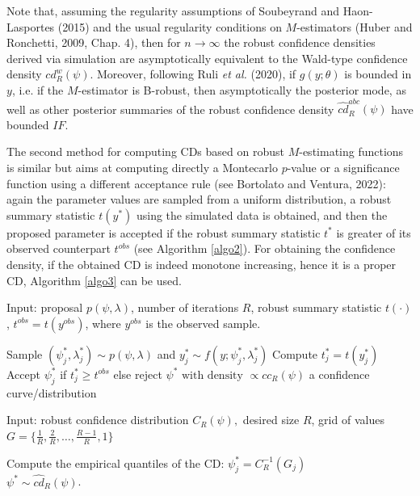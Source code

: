 \documentclass[preprint,12pt,authoryear]{elsarticle}
\begin{document}
Note that, assuming the regularity assumptions of Soubeyrand and Haon-Lasportes (2015) and the usual regularity conditions on $M$-estimators (Huber and Ronchetti, 2009, Chap. 4), then for $n \to \infty$ the robust confidence densities derived via simulation are asymptotically equivalent to the Wald-type confidence density $cd_R^w(\psi)$. Moreover, following Ruli {\em et al.} (2020), if $g(y;\theta)$ is bounded in $y$, i.e. if the $M$-estimator is B-robust, then asymptotically the posterior mode, as well as other posterior summaries of the robust confidence density $\hat{cd}_R^{abc} (\psi)$ have bounded $IF$. 

The second method  for computing  CDs based on robust $M$-estimating functions  is similar but aims at computing directly a Montecarlo $p$-value  or a significance function using a different acceptance rule (see Bortolato and Ventura, 2022): again the parameter values are sampled from a uniform distribution, a robust summary statistic $t(y^*)$  using the simulated data is obtained, and then the proposed parameter is accepted if the robust summary statistic $t^*$ is greater of its observed counterpart $t^{obs}$ (see Algorithm \ref{algo2}).
For obtaining the confidence density, if the obtained CD is indeed monotone increasing, hence it is a proper CD, Algorithm \ref{algo3} can be used.


\begin{algorithm}[H]
 \caption{Accept-reject confidence curve and confidence distribution computing}
 Input: proposal $p(\psi, \lambda)$, number of iterations $R$, robust summary statistic $t(\cdot)$, $t^{obs}=t(y^{obs})$, where $y^{obs}$ is the observed sample.
  \begin{algorithmic}
       \State Sample $(\psi_j^*, \lambda_j^*) \sim p(\psi, \lambda)$ 
 and  $y_j^*\sim f(y;\psi_j^*, \lambda_j^*)$
 \State Compute $t_j^*=t(y_j^*)$ 
\State  Accept $\psi_j^*$ if $t_j^*\geq t^{obs}$ else reject 
 \EndFor
 \Return  $\psi^{*}\text{ with density }\propto cc_R(\psi)$ a confidence curve/distribution
 \end{algorithmic} \label{algo2} 
 \end{algorithm}

 \begin{algorithm}[H]
  \caption{Confidence density} 
  Input: robust confidence distribution $C_R(\psi),$ desired  size  $R$,
 grid of values  $G= \{ \frac{1}{R}, \frac{2}{R},\ldots ,\frac{R-1}{R}, 1\}$
 \begin{algorithmic}   
 \State  Compute the empirical quantiles of the CD: 
   $\psi_j^* = C_R^{-1}(G_j)$ 
   \EndFor \\
  \Return $\psi^*\sim \hat{cd}_R(\psi)$.  
 \end{algorithmic} \label{algo3}
 \end{algorithm}
\end{document}
